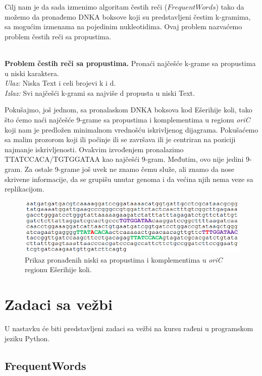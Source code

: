 Cilj nam je da sada izmenimo algoritam čestih reči ($FrequentWords$) tako da možemo da pronađemo DNKA boksove koji su predstavljeni čestim k-gramima, sa mogućim izmenama na pojedinim nukleotidima. Ovaj problem nazvaćemo problem čestih reči sa propustima.\\\\
\begin{tcolorbox}
\textbf{Problem čestih reči sa propustima.} Pronaći najčešće k-grame sa
propustima u niski karaktera.\\
\textit{Ulaz:} Niska Text i celi brojevi k i d.\\
\textit{Izlaz:} Svi najčešći k-grami sa najviše d propusta u niski Text. \\
\end{tcolorbox}
Pokušajmo, još jednom, sa pronalaskom DNKA boksova kod Ešerihije koli, tako što ćemo naći najčešće 9-grame sa propustima i komplementima u regionu \textit{oriC} koji nam je predložen minimalnom vrednošću iskrivljenog dijagrama. Pokušaćemo sa malim prozorom koji ili počinje ili se završava ili je centriran na poziciji najmanje iskrivljenosti. Ovakvim izvođenjem pronalazimo TTATCCACA/TGTGGATAA kao najčešći 9-gram. Međutim, ovo nije jedini 9-gram. Za ostale 9-grame još uvek ne znamo čemu služe, ali znamo da nose skrivene informacije, da se grupišu unutar genoma i da većina njih nema veze sa replikacijom. 

\begin{figure}[H]
\caption{Prikaz pronađenih niski sa propustima i komplementima u \textit{oriC} regionu Ešerihije koli.}
\centering
\includegraphics[width=1\textwidth]{poglavlja/1/slike/ecoli_poslednji.png}
\end{figure} 

\newpage

\section{Zadaci sa vežbi}
\setexamplecodestyle

U nastavku će biti predstavljeni zadaci sa vežbi na kursu rađeni u programskom jeziku Python.

\subsection{FrequentWords}

